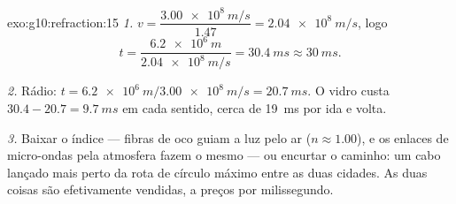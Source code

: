 \begin{solution}{exo:g10:refraction:15}
\emph{1.} $v = \dfrac{\qty{3.00e8}{m/s}}{1.47} = \qty{2.04e8}{m/s}$, logo
\[
t = \frac{\qty{6.2e6}{m}}{\qty{2.04e8}{m/s}} = \qty{30.4}{ms} \approx
\qty{30}{ms}.
\]

\emph{2.} Rádio: $t = \qty{6.2e6}{m}/\qty{3.00e8}{m/s} =
\qty{20.7}{ms}$. O vidro custa $30.4 - 20.7 = \qty{9.7}{ms}$ em cada
sentido, cerca de \qty{19}{ms} por ida e volta.

\emph{3.} Baixar o índice --- fibras de  oco guiam a luz pelo ar
($n \approx 1.00$), e os enlaces de micro-ondas pela atmosfera fazem o
mesmo --- ou encurtar o caminho: um cabo lançado mais perto da rota de
círculo máximo entre as duas cidades. As duas coisas são efetivamente
vendidas, a preços por milissegundo.
\end{solution}

